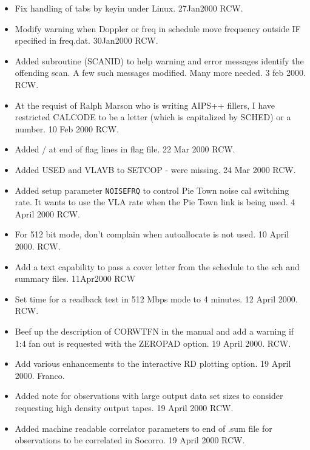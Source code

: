 \documentclass{report}
\begin{document}
\begin{itemize}
\item Fix handling of tabs by keyin under Linux.  27Jan2000 RCW.

\item Modify warning when Doppler or freq in schedule move frequency
      outside IF specified in freq.dat.  30Jan2000 RCW.

\item Added subroutine (SCANID) to help warning and error messages
      identify the offending scan.  A few such messages modified.
      Many more needed. 3 feb 2000. RCW.
\item At the requist of Ralph Marson who is writing AIPS++ fillers,
      I have restricted CALCODE to be a letter (which is capitalized
      by SCHED) or a number.  10 Feb 2000  RCW.

\item Added / at end of flag lines in flag file.  22 Mar 2000 RCW.

\item Added USED and VLAVB to SETCOP - were missing. 24 Mar 2000 RCW.

\item Added setup parameter {\tt NOISEFRQ} to control Pie Town noise
      cal switching rate.  It wants to use the VLA rate when the
      Pie Town link is being used.  4 April 2000  RCW.

\item For 512 bit mode, don't complain when autoallocate is not used.
      10 April 2000.  RCW.

\item Add a text capability to pass a cover letter from the schedule
      to the sch and summary files.  11Apr2000 RCW

\item Set time for a readback test in 512 Mbps mode to 4 minutes.
      12 April 2000.  RCW.

\item Beef up the description of CORWTFN in the manual and add a
      warning if 1:4 fan out is requested with the ZEROPAD option.
      19 April 2000.  RCW.

\item Add various enhancements to the interactive RD plotting option.
      19 April 2000.  Franco.

\item Added note for observations with large output data set sizes to
      consider requesting high density output tapes.  19 April 2000 RCW.

\item Added machine readable correlator parameters to end of .sum file
      for observations to be correlated in Socorro.  19 April 2000 RCW.


\end{itemize}
\end{document}
